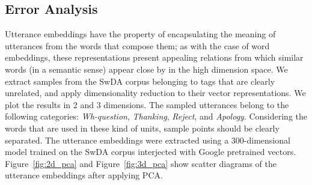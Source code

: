 \subsection{Error Analysis}
Utterance embeddings have the property of encapsulating the meaning of utterances from the words that compose them; as with the case of word embeddings, these representations present appealing relations from which similar words (in a semantic sense) appear close by in the high dimension space. We extract samples from the SwDA corpus belonging to tags that are clearly unrelated, and apply dimensionality reduction to their vector representations. We plot the results in 2 and 3 dimensions. The sampled utterances belong to the following categories: \emph{Wh-question}, \emph{Thanking}, \emph{Reject}, and \emph{Apology}. Considering the words that are used in these kind of units, sample points should be clearly separated. The utterance embeddings were extracted using a 300-dimensional model trained on the SwDA corpus interjected with Google pretrained vectors. Figure~\ref{fig:2d_pca} and Figure~\ref{fig:3d_pca} show scatter diagrams of the utterance embeddings after applying PCA.

